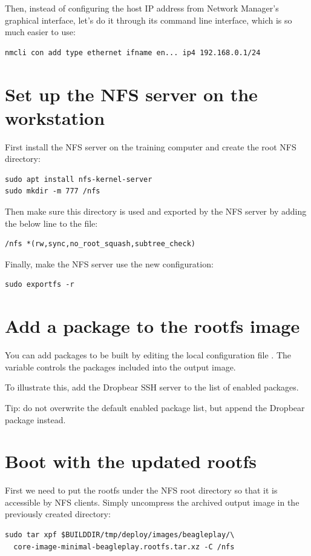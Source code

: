 Then, instead of configuring the host IP address from Network
Manager's graphical interface, let's do it through its command line
interface, which is so much easier to use:

\begin{verbatim}
nmcli con add type ethernet ifname en... ip4 192.168.0.1/24
\end{verbatim}

\section{Set up the NFS server on the workstation}

First install the NFS server on the training computer and create the root NFS
directory:
\begin{verbatim}
sudo apt install nfs-kernel-server
sudo mkdir -m 777 /nfs
\end{verbatim}

Then make sure this directory is used and exported by the NFS server by adding
the below line to the  file:

\begin{verbatim}
/nfs *(rw,sync,no_root_squash,subtree_check)
\end{verbatim}

Finally, make the NFS server use the new configuration:
\begin{verbatim}
sudo exportfs -r
\end{verbatim}

\section{Add a package to the rootfs image}

You can add packages to be built by editing the local configuration file
. The  variable controls the
packages included into the output image.

To illustrate this, add the Dropbear SSH server to the list of enabled
packages.

Tip: do not overwrite the default enabled package list, but append the Dropbear
package instead.

\section{Boot with the updated rootfs}

First we need to put the rootfs under the NFS root directory so that it is
accessible by NFS clients. Simply uncompress the archived output image in the
previously created  directory:
\begin{verbatim}
sudo tar xpf $BUILDDIR/tmp/deploy/images/beagleplay/\
  core-image-minimal-beagleplay.rootfs.tar.xz -C /nfs
\end{verbatim}


